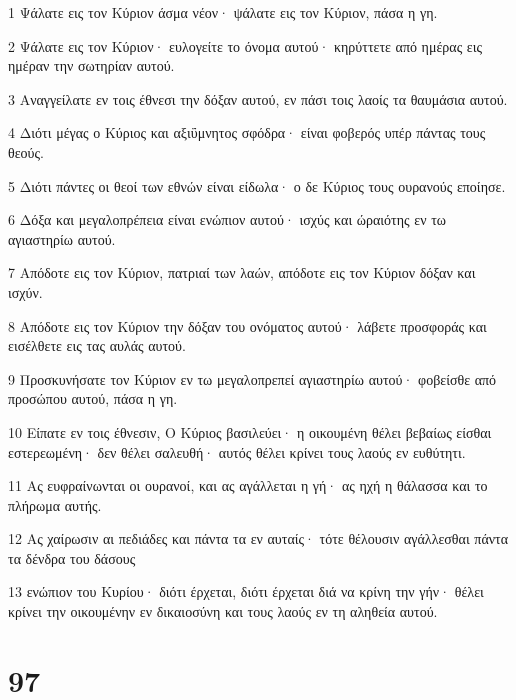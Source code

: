 \par 1 Ψάλατε εις τον Κύριον άσμα νέον· ψάλατε εις τον Κύριον, πάσα η γη.
\par 2 Ψάλατε εις τον Κύριον· ευλογείτε το όνομα αυτού· κηρύττετε από ημέρας εις ημέραν την σωτηρίαν αυτού.
\par 3 Αναγγείλατε εν τοις έθνεσι την δόξαν αυτού, εν πάσι τοις λαοίς τα θαυμάσια αυτού.
\par 4 Διότι μέγας ο Κύριος και αξιΰμνητος σφόδρα· είναι φοβερός υπέρ πάντας τους θεούς.
\par 5 Διότι πάντες οι θεοί των εθνών είναι είδωλα· ο δε Κύριος τους ουρανούς εποίησε.
\par 6 Δόξα και μεγαλοπρέπεια είναι ενώπιον αυτού· ισχύς και ώραιότης εν τω αγιαστηρίω αυτού.
\par 7 Απόδοτε εις τον Κύριον, πατριαί των λαών, απόδοτε εις τον Κύριον δόξαν και ισχύν.
\par 8 Απόδοτε εις τον Κύριον την δόξαν του ονόματος αυτού· λάβετε προσφοράς και εισέλθετε εις τας αυλάς αυτού.
\par 9 Προσκυνήσατε τον Κύριον εν τω μεγαλοπρεπεί αγιαστηρίω αυτού· φοβείσθε από προσώπου αυτού, πάσα η γη.
\par 10 Είπατε εν τοις έθνεσιν, Ο Κύριος βασιλεύει· η οικουμένη θέλει βεβαίως είσθαι εστερεωμένη· δεν θέλει σαλευθή· αυτός θέλει κρίνει τους λαούς εν ευθύτητι.
\par 11 Ας ευφραίνωνται οι ουρανοί, και ας αγάλλεται η γή· ας ηχή η θάλασσα και το πλήρωμα αυτής.
\par 12 Ας χαίρωσιν αι πεδιάδες και πάντα τα εν αυταίς· τότε θέλουσιν αγάλλεσθαι πάντα τα δένδρα του δάσους
\par 13 ενώπιον του Κυρίου· διότι έρχεται, διότι έρχεται διά να κρίνη την γήν· θέλει κρίνει την οικουμένην εν δικαιοσύνη και τους λαούς εν τη αληθεία αυτού.

\chapter{97}

